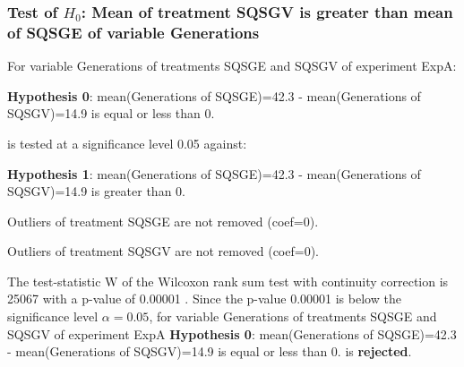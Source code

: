 \begin{frame}[t]
 \frametitle{Test of $H_{0}$: Mean of treatment SQSGV is greater than mean of SQSGE of variable Generations }
 \scriptsize
 For variable Generations of treatments SQSGE and SQSGV of experiment ExpA:

\vspace{1mm}
{\bf Hypothesis 0}: mean(Generations of SQSGE)=42.3 - mean(Generations of SQSGV)=14.9 is equal or less than 0.


 \begin{center} is tested at a significance level 0.05 against: \end{center}

{\bf Hypothesis 1}: mean(Generations of SQSGE)=42.3 - mean(Generations of SQSGV)=14.9 is greater than 0.
\vspace{1mm}
\vspace{1mm}

 Outliers of treatment SQSGE  are not removed (coef=0).

 Outliers of treatment SQSGV  are not removed (coef=0).
\vspace{1mm}
 
 The test-statistic W of the Wilcoxon rank sum test with continuity correction is 25067 with a p-value of 0.00001 .
 Since the p-value 0.00001 is below the significance level $\alpha= 0.05 $,
 for variable Generations of treatments SQSGE and SQSGV of experiment ExpA 
 {\bf Hypothesis 0}: mean(Generations of SQSGE)=42.3 - mean(Generations of SQSGV)=14.9 is equal or less than 0.
is {\bf rejected}.

 \end{frame}
